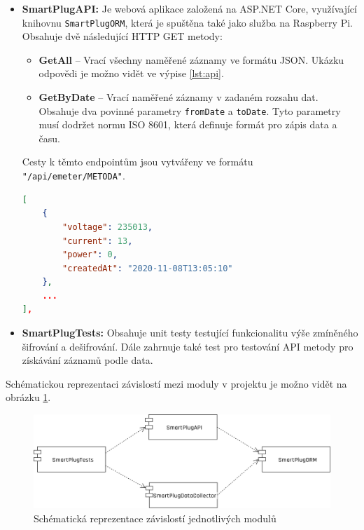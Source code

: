 \documentclass[czech,master,dept460,male,cpp,cpdeclaration,oneside]{diploma}
\begin{document}
\begin{itemize}
\item \textbf{SmartPlugAPI:}
Je webová aplikace založená na ASP.NET Core, využívající knihovnu \texttt{SmartPlugORM}, která je spuštěna také jako služba na Raspberry Pi. Obsahuje dvě následující HTTP GET metody:
\begin{itemize}
	\item \textbf{GetAll} – Vrací všechny naměřené záznamy ve formátu JSON. Ukázku odpovědi je možno vidět ve výpise \ref{lst:api}.
	\item \textbf{GetByDate} – Vrací naměřené záznamy v zadaném rozsahu dat. Obsahuje dva povinné parametry \texttt{fromDate} a \texttt{toDate}. Tyto parametry musí dodržet normu ISO 8601, která definuje formát pro zápis data a času.
\end{itemize}
\noindent Cesty k těmto endpointům jsou vytvářeny ve formátu \texttt{"/api/emeter/METODA"}.
\bigbreak
\begin{lstlisting}[language=json,caption=Ukázka odpovědi aplikačního rozhraní,label={lst:api}]
[
	{
		"voltage": 235013,
		"current": 13,
		"power": 0,
		"createdAt": "2020-11-08T13:05:10"
	},
	...
],
\end{lstlisting}

\item \textbf{SmartPlugTests:}
Obsahuje unit testy testující funkcionalitu výše zmíněného šifrování a dešifrování. Dále zahrnuje také test pro testování API metody pro získávání záznamů podle data.
		
\end{itemize}

\bigbreak
\noindent Schématickou reprezentaci závislostí mezi moduly v projektu je možno vidět na obrázku \ref{fig:ProjectDependency}.

\bigbreak

\begin{figure}[h!]
	\centering
	\includegraphics[width=1\textwidth]{Figures/ProjectDependency.png}
	\caption{Schématická reprezentace závislostí jednotlivých modulů}
	\label{fig:ProjectDependency}
\end{figure}
\end{document}

